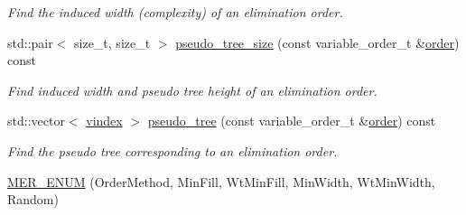 \begin{DoxyCompactItemize}
\begin{DoxyCompactList}\small\item\em Find the induced width (complexity) of an elimination order. \end{DoxyCompactList}\item 
std\+::pair$<$ size\+\_\+t, size\+\_\+t $>$ \hyperlink{classmerlin_1_1graphical__model_a60914b4dfd137288d059280a29db1d3f}{pseudo\+\_\+tree\+\_\+size} (const variable\+\_\+order\+\_\+t \&\hyperlink{classmerlin_1_1graphical__model_a90bcf3fb02f0f43bf57520e834875c78}{order}) const 
\begin{DoxyCompactList}\small\item\em Find induced width and pseudo tree height of an elimination order. \end{DoxyCompactList}\item 
std\+::vector$<$ \hyperlink{classmerlin_1_1graphical__model_a275006a490bc09239c12a4d93d53b135}{vindex} $>$ \hyperlink{classmerlin_1_1graphical__model_ab939be0ea59b1bb676e4b4ea5de0d625}{pseudo\+\_\+tree} (const variable\+\_\+order\+\_\+t \&\hyperlink{classmerlin_1_1graphical__model_a90bcf3fb02f0f43bf57520e834875c78}{order}) const 
\begin{DoxyCompactList}\small\item\em Find the pseudo tree corresponding to an elimination order. \end{DoxyCompactList}\item 
\hypertarget{classmerlin_1_1graphical__model_a912837b886d835280f269f1845dcb752}{}\hyperlink{classmerlin_1_1graphical__model_a912837b886d835280f269f1845dcb752}{M\+E\+R\+\_\+\+E\+N\+U\+M} (Order\+Method, Min\+Fill, Wt\+Min\+Fill, Min\+Width, Wt\+Min\+Width, Random)\label{classmerlin_1_1graphical__model_a912837b886d835280f269f1845dcb752}


\end{DoxyCompactItemize}
